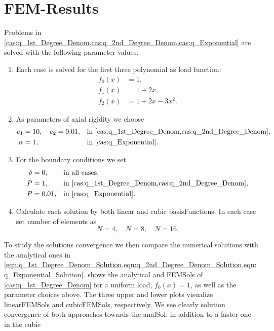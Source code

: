 \section{FEM-Results}
Problems in \cref{cas:q_1st_Degree_Denom,cas:q_2nd_Degree_Denom,cas:q_Exponential} are solved with the following parameter values:
\begin{enumerate}	\label{itm:Parameter_Values}
	\item Each case is solved for the first three polynomial as load function:
	\begin{align*}
		f_0 \left( x \right) &= 1,	\\
		f_1 \left( x \right) &= 1 + 2x,	\\
		f_2 \left( x \right) &= 1 + 2x - 3x^2.
	\end{align*}
	\item As parameters of axial rigidity we choose
	\begin{align*}
		e_1		&= 10,	\quad e_2 = 0.01,	&& \text{in \cref{cas:q_1st_Degree_Denom,cas:q_2nd_Degree_Denom},}	\\
		\alpha	&= 1, 						&&	\text{in \cref{cas:q_Exponential}.}
	\end{align*}
	\item For the boundary conditions we set
	\begin{align*}
		\delta	&= 0,			&&		\text{in all cases,}	\\
		P 		&= 1,			&&		\text{in \cref{cas:q_1st_Degree_Denom,cas:q_2nd_Degree_Denom},}	\\
		P 		&= 0.01,		&&		\text{in \cref{cas:q_Exponential}.}
	\end{align*}
	\item Calculate each solution by both linear and cubic \glspl{basisFunction}. In each case set number of elements as
	\begin{equation*}
		N = 4, \quad N = 8, \quad  N = 16.
	\end{equation*}
\end{enumerate}
To study the solutions convergence we then compare the numerical solutions with the analytical ones
in \cref{eqn:q_1st_Degree_Denom_Solution,eqn:q_2nd_Degree_Denom_Solution,eqn:q_Exponential_Solution}.
 shows the analytical and \glspl{FEMSol} of \cref{cas:q_1st_Degree_Denom} for a uniform load,
$f_{0} \left( x \right) = 1$, as well as the parameter choices above. The three upper and lower plots visualize
\gls{linearFEMSol}s and \gls{cubicFEMSol}s, respectively.
We see clearly solution convergence of both approaches towards the \gls{analSol}, in addition to a faster one in the cubic
